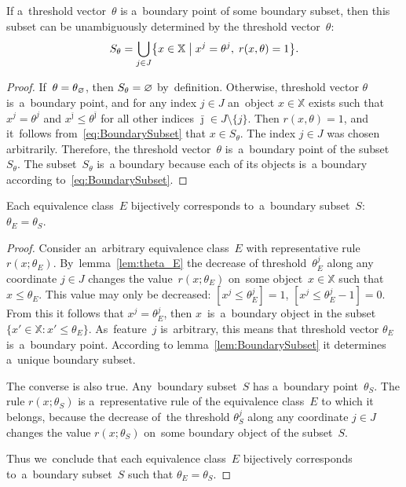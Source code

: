 \documentclass{article}
\def\XX{\mathbb{X}}
\renewcommand{\leq}{\leqslant}
\begin{document}
\begin{lemma}
\label{lem:BoundarySubset}
    If a~threshold vector~$\theta$ is a~boundary point of some boundary subset,
    then this subset can be unambiguously determined by the threshold vector~$\theta$:
    \begin{equation}
    \label{eq:BoundarySubset}
        S_\theta =
        \bigcup_{j\in J}
        \bigl\{
            x\in\XX
        \bigm|
            x^j = \theta^j,\;
            r(x,\theta) = 1
        \bigr\}.
    \end{equation}
\end{lemma}
\begin{proof}
    If~${\theta = \theta_\varnothing}$, then ${S_\theta=\varnothing}$ by~definition.
    Otherwise,
    threshold vector $\theta$ is~a~boundary point,
    and
    for any index ${j\in J}$ an~object ${x\in \XX}$ exists such that
    ${x^j = \theta^j}$ and
    ${x^{\bar\jmath} \leq \theta^{\bar\jmath}}$ for all other indices ${\bar\jmath \in J\setminus \{j\}}$.
    Then  $r(x,\theta) = 1$,
    and it~follows from~\eqref{eq:BoundarySubset} that $x\in S_\theta$.
    The index ${j\in J}$ was chosen arbitrarily.
    Therefore, the threshold vector~$\theta$ is~a~boundary point of the subset~$S_\theta$.
    The subset~$S_\theta$ is~a boundary because
    each of its objects is~a boundary according to~\eqref{eq:BoundarySubset}.
\end{proof}

\begin{theorem}
\label{th:thetaE=thetaS}
    Each equivalence class~$E$ bijectively corresponds
    to~a~boundary subset~$S$: $\theta_E = \theta_S$.
\end{theorem}
\begin{proof}
    Consider an~arbitrary equivalence class~$E$ with representative rule $r(x;\theta_E)$.
    By~lemma~\ref{lem:theta_E} the decrease of threshold~$\theta^j_E$ along any coordinate ${j\in J}$
    changes the value~$r(x;\theta_E)$ on~some object~$x\in\XX$ such that $x\leq \theta_E$.
    This value may only be decreased:
    ${[x^j \leq \theta^j_E] = 1}$,\;
    ${[x^j \leq \theta^j_E-1] = 0}$.
    From this it follows that
    ${x^j = \theta^j_E}$,
    then $x$~is~a~boundary object in the subset
    ${\bigl\{ x'\in\XX \colon x'\leq \theta_E\bigr\}}$.
    As~feature~$j$ is~arbitrary, this means that
    threshold vector $\theta_E$ is~a~boundary point.
    According to lemma~\ref{lem:BoundarySubset} it determines a~unique boundary subset.

    The converse is also true.
    Any~boundary subset~$S$ has a~boundary point~$\theta_S$.
    The rule $r(x;\theta_S)$ is a~representative rule of the equivalence class~$E$ to which it belongs,
    because the decrease of~the threshold $\theta^j_S$ along any coordinate ${j\in J}$
    changes the value $r(x;\theta_S)$ on~some boundary object of the subset~$S$.

    Thus we~conclude that each equivalence class~$E$ bijectively corresponds
    to~a~boundary subset~$S$ such that $\theta_E = \theta_S$.
\end{proof}
\end{document}
